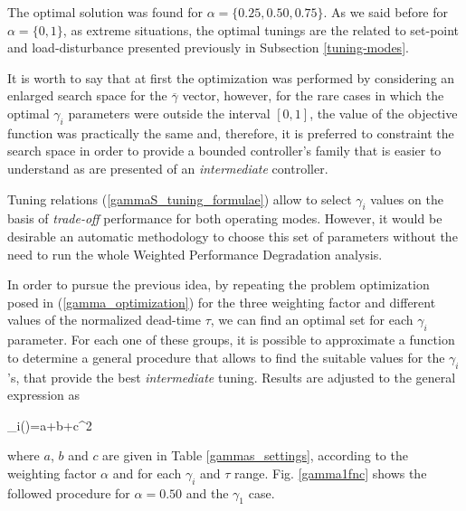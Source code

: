 The optimal solution was found for $\alpha=\{0.25, 0.50, 0.75\}$.
As we said before for $\alpha=\{0, 1\}$, as extreme situations,
the optimal tunings are the related to set-point and
load-disturbance presented previously in Subsection
\ref{tuning-modes}.

It is worth to say that at first the optimization was performed by
considering an enlarged search space for the $\overline{\gamma}$
vector, however, for the rare cases in which the optimal
$\gamma_i$ parameters were outside the interval $[0,1]$, the value
of the objective function was practically the same and, therefore,
it is preferred to constraint the search space in order to provide
a bounded controller's family that is easier to understand as are
presented of an \emph{intermediate} controller.

Tuning relations (\ref{gammaS_tuning_formulae}) allow to select
$\gamma_i$ values on the basis of \emph{trade-off} performance for
both operating modes. However, it would be desirable an automatic
methodology to choose this set of parameters without the need to
run the whole Weighted Performance Degradation analysis.

In order to pursue the previous idea, by repeating the problem
optimization posed in (\ref{gamma_optimization}) for the three
weighting factor and different values of the normalized dead-time
$\tau$, we can find an optimal set for each $\gamma_i$ parameter.
For each one of these groups, it is possible to approximate a
function to determine a general procedure that allows to find the
suitable values for the $\gamma_i$'s, that provide the best
\emph{intermediate} tuning. Results are adjusted to the general
expression as

\be
\gamma_i(\tau)=a+b\tau+c\tau^2 \qquad \tau \in [0.1,1.0] \cup
[1.1,2.0] \label{gammas-eq} \ee

\noindent where $a$, $b$ and $c$ are given in Table
\ref{gammas_settings}, according to the weighting factor $\alpha$
and for each $\gamma_i$ and $\tau$ range. Fig. \ref{gamma1fnc}
shows the followed procedure for $\alpha=0.50$ and the $\gamma_1$
case.

